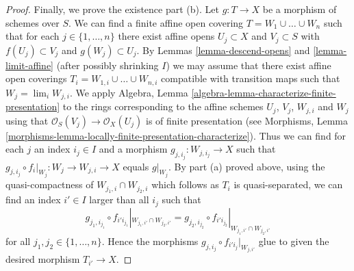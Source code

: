 \begin{proof}
\medskip\noindent
Finally, we prove the existence part (b).
Let $g : T \to X$ be a morphism of schemes over $S$.
We can find a finite affine open covering
$T = W_1 \cup \ldots \cup W_n$ such that for
each $j \in \{1, \ldots, n\}$ there exist affine opens
$U_j \subset X$ and $V_j \subset S$ with $f(U_j) \subset V_j$
and $g(W_j) \subset U_j$. By Lemmas \ref{lemma-descend-opens}
and \ref{lemma-limit-affine}
(after possibly shrinking $I$) we may assume that
there exist affine open coverings $T_i = W_{1, i} \cup \ldots \cup W_{n, i}$
compatible with transition maps such that $W_j = \lim_i W_{j, i}$.
We apply Algebra, Lemma \ref{algebra-lemma-characterize-finite-presentation}
to the rings corresponding to the affine schemes $U_j$, $V_j$, $W_{j, i}$ and
$W_j$ using that $\mathcal{O}_S(V_j) \to \mathcal{O}_X(U_j)$ is of finite
presentation (see Morphisms,
Lemma \ref{morphisms-lemma-locally-finite-presentation-characterize}).
Thus we can find for each $j$ an index $i_j \in I$ and a morphism
$g_{j, i_j} : W_{j, i_j} \to X$ such that
$g_{j, i_j} \circ f_i|_{W_j} : W_j \to W_{j, i} \to X$
equals $g|_{W_j}$. By part (a) proved above, using the quasi-compactness of
$W_{j_1, i} \cap W_{j_2, i}$ which follows as $T_i$ is quasi-separated,
we can find an index $i' \in I$ larger than all $i_j$ such that
$$
g_{j_1, i_{j_1}} \circ f_{i'i_{j_1}}|_{W_{j_1, i'} \cap W_{j_2, i'}} =
g_{j_2, i_{j_2}} \circ f_{i'i_{j_2}}|_{W_{j_1, i'} \cap W_{j_2, i'}}
$$
for all $j_1, j_2 \in \{1, \ldots, n\}$. Hence the morphisms
$g_{j, i_j} \circ f_{i'i_j}|_{W_{j, i'}}$ glue to given the
desired morphism $T_{i'} \to X$.
\end{proof}
